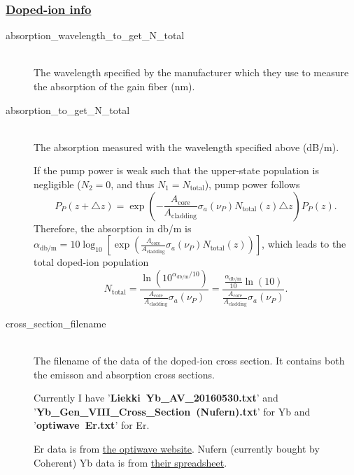 \documentclass[12pt,hidelinks]{book}
\begin{document}
\subsubsection{\underline{Doped-ion info}}
\begin{description}
\item[\color{blue}absorption\_wavelength\_to\_get\_N\_total]\mbox{}\\
The wavelength specified by the manufacturer which they use to measure the absorption of the gain fiber (\si{\nm}).

\item[\color{blue}absorption\_to\_get\_N\_total]\mbox{}\\
The absorption measured with the wavelength specified above (\si{\dB/m}).

If the pump power is weak such that the upper-state population is negligible ($N_2=0$, and thus $N_1=N_{\text{total}}$), pump power follows
\begin{equation}
P_P(z+\triangle z)=\exp\left(-\frac{A_{\text{core}}}{A_{\text{cladding}}}\sigma_a(\nu_P)N_{\text{total}}(z)\triangle z\right)P_P(z).
\end{equation}
Therefore, the absorption in \si{\decibel/\m} is $\alpha_{\si{\decibel/\m}}=10\log_{10}\left[\exp\left(\frac{A_{\text{core}}}{A_{\text{cladding}}}\sigma_a(\nu_P)N_{\text{total}}(z)\right)\right]$, which leads to the total doped-ion population
\begin{equation}
N_{\text{total}}=\frac{\ln\left(10^{\alpha_{\si{\decibel/\m}}/10}\right)}{\frac{A_{\text{core}}}{A_{\text{cladding}}}\sigma_a(\nu_P)}=\frac{\frac{\alpha_{\si{\decibel/\m}}}{10}\ln\left(10\right)}{\frac{A_{\text{core}}}{A_{\text{cladding}}}\sigma_a(\nu_P)}.
\end{equation}

\item[\color{blue}cross\_section\_filename]\mbox{}\\
The filename of the data of the doped-ion cross section. It contains both the emisson and absorption cross sections.

Currently I have '\textbf{Liekki\ Yb\_AV\_20160530.txt}' and '\textbf{Yb\_Gen\_VIII\_Cross\_Section\ (Nufern).txt}' for Yb and '\textbf{optiwave\ Er.txt}' for Er.

Er data is from \href{https://optiwave.com/resources/applications-resources/optical-system-edfa-basic-concepts/}{the optiwave website}. Nufern (currently bought by Coherent) Yb data is from \href{https://www.coherent.com/resources/application-note/components-and-accessories/specialty-optical-fibers/yb-absorption-emission.pdf}{their spreadsheet}.


\end{description}
\end{document}
